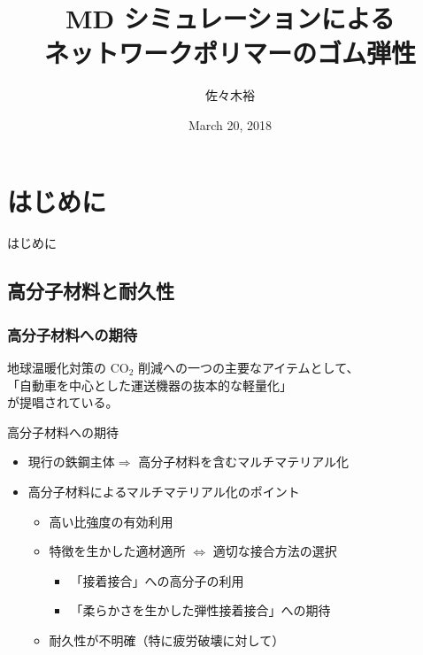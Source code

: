 \documentclass[unicode,11pt]{beamer}%
\title
[MD シミュレーションによるネットワークポリマーのゴム弾性]
{MD シミュレーションによる\\ネットワークポリマーのゴム弾性}
\author[東亞合成　佐々木、大村]{佐々木裕}
\institute[東亞合成]{東亞合成}
\date{March 20, 2018}
\begin{document}
\begin{frame}\frametitle{}
	\titlepage
\end{frame}



\section{はじめに}
\begin{frame}
\LARGE{はじめに}
\end{frame}


\subsection{高分子材料と耐久性}

\begin{frame}
\frametitle{高分子材料への期待}

地球温暖化対策の CO$_2$ 削減への一つの主要なアイテムとして、\\
{\Large
{\color{red}「自動車を中心とした運送機器の抜本的な軽量化」}
}\\
が提唱されている。
\begin{block}{高分子材料への期待}
	\begin{itemize}
	\item
	現行の鉄鋼主体$ \Rightarrow$ 高分子材料を含むマルチマテリアル化
	
	\item
	高分子材料によるマルチマテリアル化のポイント
		\begin{itemize}
		\item
		高い比強度の有効利用
		\item
		特徴を生かした適材適所 $\Leftrightarrow$ 適切な接合方法の選択
			\begin{itemize}
			\item
			{\color{red} 「接着接合」への高分子の利用}
			\item
			{\color{red} 「柔らかさを生かした弾性接着接合」への期待}
			\end{itemize}
		\item
		{\color{blue}耐久性が不明確（特に疲労破壊に対して）}
		\end{itemize}
	\end{itemize}
\end{block}
\end{frame}
\end{document}
